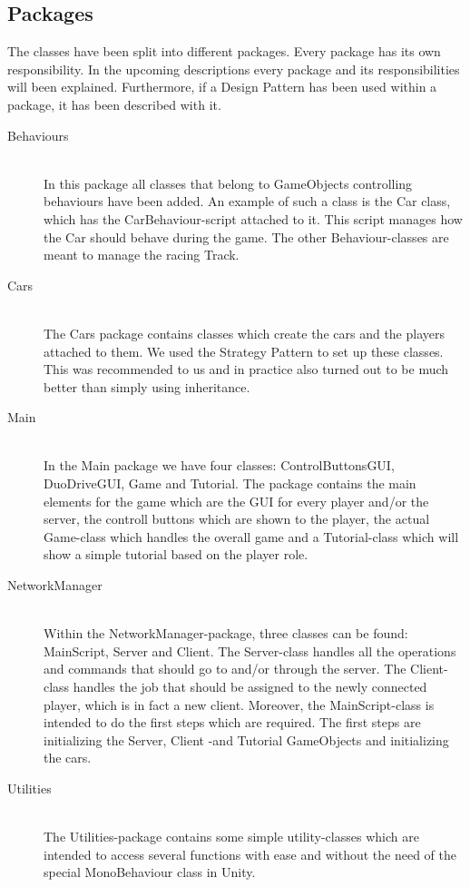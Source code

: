 \documentclass[11pt,twoside,a4paper]{article}
\begin{document}
\subsection{Packages}
The classes have been split into different packages. Every package has its own responsibility. In the upcoming descriptions every package and its responsibilities will been explained. Furthermore, if a Design Pattern has been used within a package, it has been described with it.

\begin{description}
\item[Behaviours] \hfill \\
    In this package all classes that belong to GameObjects controlling behaviours have been added. An example of such a class is the Car class, which has the CarBehaviour-script attached to it. This script manages how the Car should behave during the game. The other Behaviour-classes are meant to manage the racing Track.
\item[Cars] \hfill \\
    The Cars package contains classes which create the cars and the players attached to them. We used the Strategy Pattern to set up these classes. This was recommended to us and in practice also turned out to be much better than simply using inheritance.
\item[Main] \hfill \\
    In the Main package we have four classes: ControlButtonsGUI, DuoDriveGUI, Game and Tutorial. The package contains the main elements for the game which are the GUI for every player and/or the server, the controll buttons which are shown to the player, the actual Game-class which handles the overall game and a Tutorial-class which will show a simple tutorial based on the player role.
\item[NetworkManager] \hfill \\
    Within the NetworkManager-package, three classes can be found: MainScript, Server and Client. The Server-class handles all the operations and commands that should go to and/or through the server. The Client-class handles the job that should be assigned to the newly connected player, which is in fact a new client. Moreover, the MainScript-class is intended to do the first steps which are required. The first steps are initializing the Server, Client -and Tutorial GameObjects and initializing the cars.
\item[Utilities] \hfill \\
    The Utilities-package contains some simple utility-classes which are intended to access several functions with ease and without the need of the special MonoBehaviour class in Unity.

\end{description}
\end{document}
